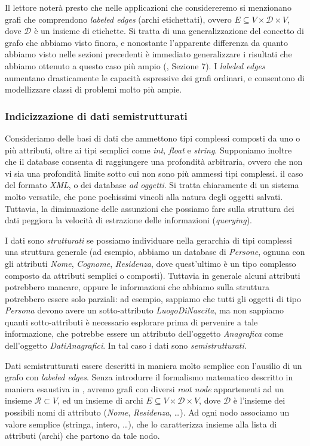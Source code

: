 Il lettore noterà presto che nelle applicazioni che considereremo si menzionano grafi che comprendono \emph{labeled edges} (archi etichettati), ovvero $E \subseteq V \times \mathcal{D} \times V$, dove $\mathcal{D}$ è un insieme di etichette. Si tratta di una generalizzazione del concetto di grafo che abbiamo visto finora, e nonostante l'apparente differenza da quanto abbiamo visto nelle sezioni precedenti è immediato generalizzare i risultati che abbiamo ottenuto a questo caso più ampio (\cite{dovier}, Sezione 7). I \emph{labeled edges} aumentano drasticamente le capacità espressive dei grafi ordinari, e consentono di modellizzare classi di problemi molto più ampie.

\subsubsection{Indicizzazione di dati semistrutturati}
Consideriamo delle basi di dati che ammettono tipi complessi composti da uno o più attributi, oltre ai tipi semplici come \emph{int, float} e \emph{string}. Supponiamo inoltre che il database consenta di raggiungere una profondità arbitraria, ovvero che non vi sia una profondità limite sotto cui non sono più ammessi tipi complessi. \accente il caso del formato \emph{XML}, o dei database \emph{ad oggetti}. Si tratta chiaramente di un sistema molto versatile, che pone pochissimi vincoli alla natura degli oggetti salvati. Tuttavia, la diminuazione delle assunzioni che possiamo fare sulla struttura dei dati peggiora la velocità di estrazione delle informazioni (\emph{querying}).

I dati sono \emph{strutturati} se possiamo individuare nella gerarchia di tipi complessi una struttura generale (ad esempio, abbiamo un database di \emph{Persone}, ognuna con gli attributi \emph{Nome}, \emph{Cognome}, \emph{Residenza}, dove quest'ultimo è un tipo complesso composto da attributi semplici o composti). Tuttavia in generale alcuni attributi potrebbero mancare, oppure le informazioni che abbiamo sulla struttura potrebbero essere solo parziali: ad esempio, sappiamo che tutti gli oggetti di tipo \emph{Persona} devono avere un sotto-attributo \emph{LuogoDiNascita}, ma non sappiamo quanti sotto-attributi è necessario esplorare prima di pervenire a tale informazione, che potrebbe essere un attributo dell'oggetto \emph{Anagrafica} come dell'oggetto \emph{DatiAnagrafici}. In tal caso i dati sono \emph{semistrutturati}.

Dati semistrutturati essere descritti in maniera molto semplice con l'ausilio di un grafo con \emph{labeled edges}. Senza introdurre il formalismo matematico descritto in maniera esaustiva in \cite{milo}, avremo grafi con diversi \emph{root node} appartenenti ad un insieme $\mathcal{R} \subset V$, ed un insieme di archi $E \subseteq V \times \mathcal{D} \times V$, dove $\mathcal{D}$ è l'insieme dei possibili nomi di attributo (\emph{Nome}, \emph{Residenza}, \dots). Ad ogni nodo associamo un valore semplice (stringa, intero, \dots), che lo caratterizza insieme alla lista di attributi (archi) che partono da tale nodo.

